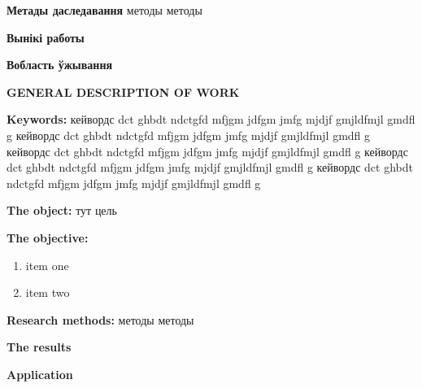\textbf{Метады даследавання} методы методы

\textbf{Вынікі работы}

\textbf{Вобласть ўжывання}


\newpage
{}
\begin{center}
	\textbf{\large GENERAL DESCRIPTION OF WORK}
\end{center}

\textbf{Keywords:} кейвордс dct ghbdt ndctgfd mfjgm jdfgm jmfg mjdjf gmjldfmjl gmdfl g
кейвордс dct ghbdt ndctgfd mfjgm jdfgm jmfg mjdjf gmjldfmjl gmdfl g
кейвордс dct ghbdt ndctgfd mfjgm jdfgm jmfg mjdjf gmjldfmjl gmdfl g
кейвордс dct ghbdt ndctgfd mfjgm jdfgm jmfg mjdjf gmjldfmjl gmdfl g
кейвордс dct ghbdt ndctgfd mfjgm jdfgm jmfg mjdjf gmjldfmjl gmdfl g

\textbf{The object:} тут цель

\textbf{The objective:}
\begin{enumerate}
	\item item one
	\item item two
\end{enumerate}


\textbf{Research methods:} методы методы

\textbf{The results}

\textbf{Application}